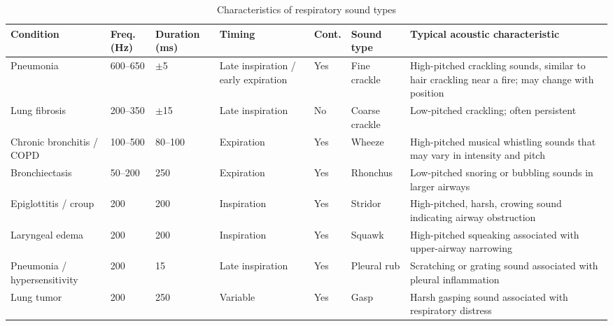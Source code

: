 \begin{table}[!t]
\centering
\caption{Characteristics of respiratory sound types}
\label{tab:resp_chars}
\footnotesize
\setlength{\tabcolsep}{3pt}
\renewcommand{\arraystretch}{1.12}
\begin{tabularx}{\textwidth}{@{}p{2.2cm}p{1.4cm}p{1.4cm}p{2.2cm}p{1.2cm}p{1.6cm}X@{}}
\toprule
\textbf{Condition} & \textbf{Freq. (Hz)} & \textbf{Duration (ms)} & \textbf{Timing} & \textbf{Cont.} & \textbf{Sound type} & \textbf{Typical acoustic characteristic} \\
\midrule
Pneumonia & 600--650 & $\pm$5 & Late inspiration / early expiration & Yes & Fine crackle & High-pitched crackling sounds, similar to hair crackling near a fire; may change with position \\
Lung fibrosis & 200--350 & $\pm$15 & Late inspiration & No & Coarse crackle & Low-pitched crackling; often persistent \\
Chronic bronchitis / COPD & 100--500 & 80--100 & Expiration & Yes & Wheeze & High-pitched musical whistling sounds that may vary in intensity and pitch \\
Bronchiectasis & 50--200 & 250 & Expiration & Yes & Rhonchus & Low-pitched snoring or bubbling sounds in larger airways \\
Epiglottitis / croup & 200 & 200 & Inspiration & Yes & Stridor & High-pitched, harsh, crowing sound indicating airway obstruction \\
Laryngeal edema & 200 & 200 & Inspiration & Yes & Squawk & High-pitched squeaking associated with upper-airway narrowing \\
Pneumonia / hypersensitivity & 200 & 15 & Late inspiration & Yes & Pleural rub & Scratching or grating sound associated with pleural inflammation \\
Lung tumor & 200 & 250 & Variable & Yes & Gasp & Harsh gasping sound associated with respiratory distress \\
\bottomrule
\end{tabularx}
\end{table}
